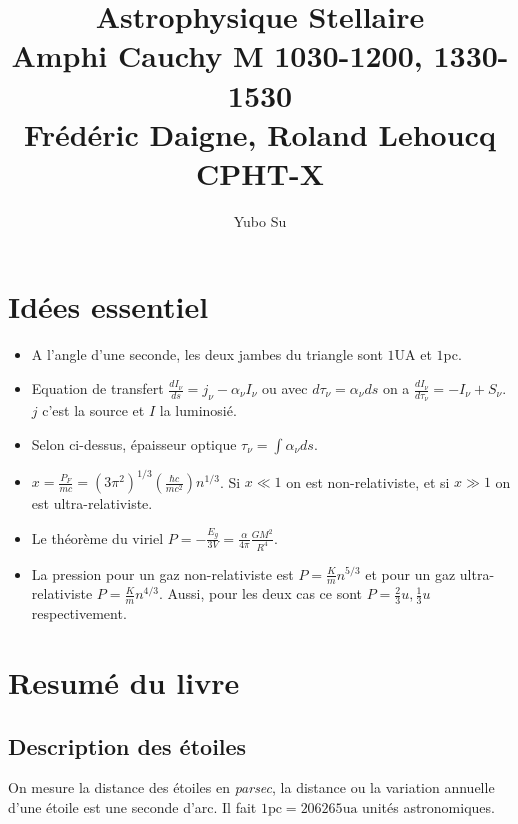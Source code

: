 \documentclass[10pt]{report}
\newcommand{\rd}[2]{\frac{d#1}{d#2}}
\begin{document}
\title{Astrophysique Stellaire\\ Amphi Cauchy M 1030-1200, 1330-1530\\ Fr\'ed\'eric Daigne, Roland Lehoucq CPHT-X}
\author{Yubo Su}
\date{}
\maketitle

\tableofcontents

\chapter{Id\'ees essentiel}

\begin{itemize}
    \item A l'angle d'une seconde, les deux jambes du triangle sont $1$UA et $1$pc.
    \item Equation de transfert $\rd{I_\nu}{s} = j_\nu - \alpha_\nu I_\nu$ ou avec $d\tau_\nu = \alpha_\nu ds$ on a $\rd{I_\nu}{\tau_\nu} = -I_\nu + S_\nu$. $j$ c'est la source et $I$ la luminosi\'e.
    \item Selon ci-dessus, \'epaisseur optique $\tau_\nu = \int \alpha_\nu ds$.
    \item $x = \frac{P_F}{mc} = \left( 3\pi^2 \right)^{1/3}\left( \frac{\hbar c}{mc^2} \right)n^{1/3}$. Si $x \ll 1$ on est non-relativiste, et si $x \gg 1$ on est ultra-relativiste.
    \item Le th\'eor\`eme du viriel $P = -\frac{E_g}{3V} = \frac{\alpha}{4\pi}\frac{GM^2}{R^4}$.
    \item La pression pour un gaz non-relativiste est $P = \frac{K}{m}n^{5/3}$ et pour un gaz ultra-relativiste $P = \frac{K}{m}n^{4/3}$. Aussi, pour les deux cas ce sont $P = \frac{2}{3}u, \frac{1}{3}u$ respectivement.
\end{itemize}
\chapter{Resum\'e du livre}

\section{Description des \'etoiles}

On mesure la distance des \'etoiles en \emph{parsec}, la distance ou la variation annuelle d'une \'etoile est une seconde d'arc. Il fait $1\mathrm{pc} = 206265\mathrm{ua}$ unit\'es astronomiques.
\end{document}
